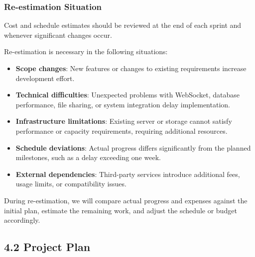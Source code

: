 \documentclass[12pt]{article}
\begin{document}
\subsubsection*{Re-estimation Situation}
\par\medskip
Cost and schedule estimates should be reviewed at the end of each sprint and whenever significant changes occur.
\par\medskip
Re-estimation is necessary in the following situations:
\par\medskip
\begin{itemize}
\item \textbf{Scope changes}: New features or changes to existing requirements increase development effort.
\par
\item \textbf{Technical difficulties}: Unexpected problems with WebSocket, database performance, file sharing, or system integration delay implementation.
\par
\item \textbf{Infrastructure limitations}: Existing server or storage cannot satisfy performance or capacity requirements, requiring additional resources.
\par
\item \textbf{Schedule deviations}: Actual progress differs significantly from the planned milestones, such as a delay exceeding one week.
\par
\item \textbf{External dependencies}: Third-party services introduce additional fees, usage limits, or compatibility issues.
\par
\end{itemize}
During re-estimation, we will compare actual progress and expenses against the initial plan, estimate the remaining work, and adjust the schedule or budget accordingly.
\par\medskip
\hypertarget{sec:42-project-plan}{}
\subsection*{4.2 Project Plan}
\par\medskip
\hypertarget{sec:421-phase-plan}{}
\end{document}
